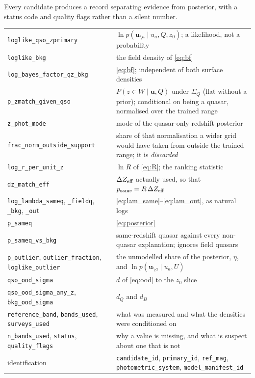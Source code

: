 \documentclass[11pt,a4paper]{article}
\newcommand{\uvec}{\mathbf{u}}
\newcommand{\Sq}{\Sigma_{Q}}
\begin{document}
Every candidate produces a record separating evidence from posterior, with a
status code and quality flags rather than a silent number.

\begin{center}
\small
\begin{tabular}{@{}p{5.2cm}p{9.6cm}@{}}
\toprule
\texttt{loglike\_qso\_zprimary} & $\ln p(\uvec_{\setminus a}\mid u_a,Q,z_0)$; a
likelihood, not a probability \\
\texttt{loglike\_bkg} & the field density of \eqref{eq:bf} \\
\texttt{log\_bayes\_factor\_qz\_bkg} & \eqref{eq:bf}; independent of both
surface densities \\
\texttt{p\_zmatch\_given\_qso} & $P(z\in W\mid\uvec,Q)$ under $\Sq$ (flat without
a prior); conditional on being a quasar, normalised over the trained range \\
\texttt{z\_phot\_mode} & mode of the quasar-only redshift posterior \\
\texttt{frac\_norm\_outside\_support} & share of that normalisation a wider grid
would have taken from outside the trained range; it is \emph{discarded} \\
\texttt{log\_r\_per\_unit\_z} & $\ln R$ of \eqref{eq:R}; the ranking statistic \\
\texttt{dz\_match\_eff} & $\Delta Z_{\rm eff}$ actually used, so that
$p_{\rm same}=R\,\Delta Z_{\rm eff}$ \\
\texttt{log\_lambda\_sameq}, \texttt{\_fieldq}, \texttt{\_bkg}, \texttt{\_out} &
\eqref{eq:lam_same}--\eqref{eq:lam_out}, as natural logs \\
\texttt{p\_sameq} & \eqref{eq:posterior} \\
\texttt{p\_sameq\_vs\_bkg} & same-redshift quasar against every non-quasar
explanation; ignores field quasars \\
\texttt{p\_outlier}, \texttt{outlier\_fraction}, \texttt{loglike\_outlier} &
the unmodelled share of the posterior, $\eta$, and $\ln p(\uvec_{\setminus a}\mid
u_a,U)$ \\
\texttt{qso\_ood\_sigma} & $d$ of \eqref{eq:ood} to the $z_0$ slice \\
\texttt{qso\_ood\_sigma\_any\_z}, \texttt{bkg\_ood\_sigma} & $d_Q$ and $d_B$ \\
\texttt{reference\_band}, \texttt{bands\_used}, \texttt{surveys\_used} & what was
measured and what the densities were conditioned on \\
\texttt{n\_bands\_used}, \texttt{status}, \texttt{quality\_flags} & why a value
is missing, and what is suspect about one that is not \\
identification & \texttt{candidate\_id}, \texttt{primary\_id},
\texttt{ref\_mag}, \texttt{photometric\_system}, \texttt{model\_manifest\_id} \\
\bottomrule
\end{tabular}
\end{center}
\end{document}
